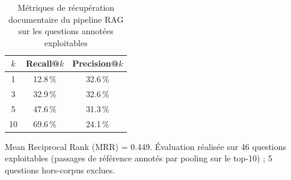 \begin{table}[H]
\centering \small
\renewcommand{\arraystretch}{1.25}
\caption{Métriques de récupération documentaire du pipeline RAG sur les questions annotées exploitables}
\label{tab:rag_retrieval_success}
\begin{tabular}{|c|c|c|}
\hline
\textbf{$k$} & \textbf{Recall@$k$} & \textbf{Precision@$k$} \\
\hline
1 & 12.8\,\% & 32.6\,\% \\
\hline
3 & 32.9\,\% & 32.6\,\% \\
\hline
5 & 47.6\,\% & 31.3\,\% \\
\hline
10 & 69.6\,\% & 24.1\,\% \\
\hline
\end{tabular}

\vspace{0.4em}
\footnotesize Mean Reciprocal Rank (MRR) = 0.449. Évaluation réalisée sur
46 questions exploitables (passages de référence annotés par pooling sur le
top-10) ; 5 questions hors-corpus exclues.
\end{table}
